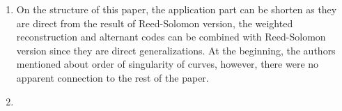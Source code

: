 \documentclass{article}
\begin{document}
\begin{enumerate}
    \item On the structure of this paper, the application part can be shorten as they are direct from the result of Reed-Solomon version, the weighted reconstruction and alternant codes can be combined with Reed-Solomon version since they are direct generalizations. At the beginning, the authors mentioned about order of singularity of curves, however, there were no apparent connection to the rest of the paper.

	\item {}

\end{enumerate}




\pagebreak

\end{document}
